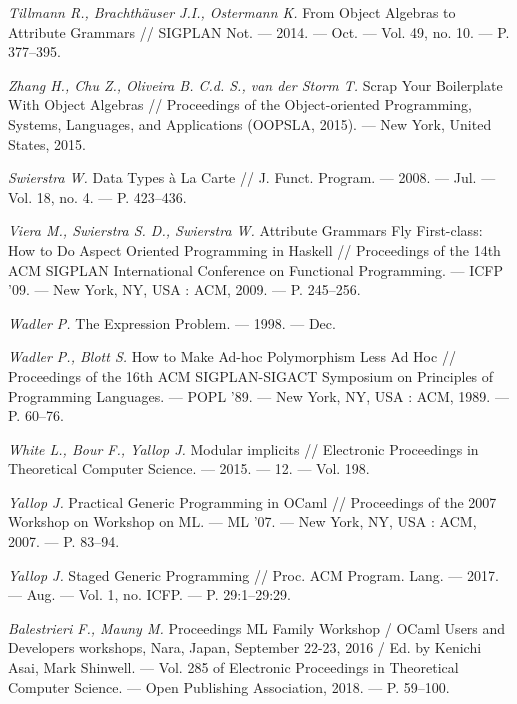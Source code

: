 \documentclass[a4paper,twoside,11pt]{article}
\numberwithin{equation}{section}
\begin{document}
\begin{thebibliography}{99}
{\em Tillmann R., Brachth\"auser J.I., Ostermann K. } From Object Algebras to Attribute Grammars //
 SIGPLAN Not. — 2014. — Oct. — Vol. 49, no. 10. — P. 377–395. 

{\em Zhang H., Chu Z.,  Oliveira B. C.d. S., van der Storm T.}
Scrap Your Boilerplate With Object Algebras  // Proceedings of the Object-oriented Programming, Systems, Languages, and
 Applications (OOPSLA, 2015). — New York, United States, 2015. %

{\em Swierstra W.} Data Types \`a La Carte // J. Funct. Program. —
 2008. — Jul. — Vol. 18, no. 4. — P. 423–436.

{\em Viera M., Swierstra S. D., Swierstra W.} Attribute
 Grammars Fly First-class: How to Do Aspect Oriented 
 Program\-ming in Haskell // Proceedings of the 14th ACM SIGPLAN 
 In\-ternational Conference on Functional Programming. — ICFP ’09. —
 New York, NY, USA : ACM, 2009. — P. 245–256. 

{\em Wadler P.} The Expression Problem. — 1998. — Dec.
 
{\em Wadler P., Blott S.} How to Make Ad-hoc Polymorphism Less Ad
 Hoc // Proceedings of the 16th ACM SIGPLAN-SIGACT Symposium on Principles of Programming Languages. — POPL ’89. — New
 York, NY, USA : ACM, 1989. — P. 60–76. 

{\em White L., Bour F., Yallop J.} Modular implicits // Electronic Proceedings in Theoretical Computer Science. — 2015. — 12. —
 Vol. 198.
 
{\em Yallop J.} Practical Generic Programming in OCaml // Proceedings of the 2007 Workshop on Workshop on ML. — ML ’07. —
 New York, NY, USA : ACM, 2007. — P. 83–94. 

{\em  Yallop J.} Staged Generic Programming // Proc. ACM Program. Lang. — 2017. — Aug. — Vol. 1, no. ICFP. — P. 29:1–29:29. 

{\em  Balestrieri F., Mauny M.} Proceedings ML Family Workshop / OCaml Users and Developers
workshops, Nara, Japan, September 22-23, 2016 / Ed. by Kenichi Asai,
Mark Shinwell. — Vol. 285 of Electronic Proceedings in Theoretical
Computer Science. — Open Publishing Association, 2018. — P. 59–100.


\end{thebibliography}
\end{document}
